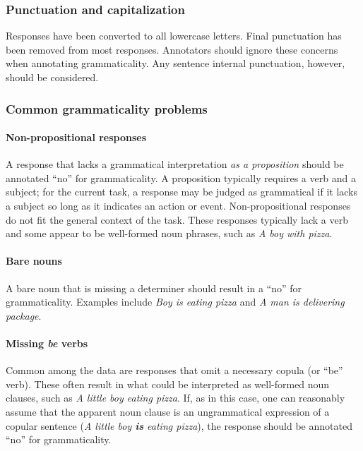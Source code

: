 \documentclass[12pt,notitlepage]{article}
\begin{document}
\subsubsection{Punctuation and capitalization} Responses have been converted to all lowercase letters. Final punctuation has been removed from most responses. Annotators should ignore these concerns when annotating grammaticality. Any sentence internal punctuation, however, should be considered.

\subsubsection{Common grammaticality problems}

\paragraph{Non-propositional responses} \label{para:non-propositional} A response that lacks a grammatical interpretation \textit{as a proposition} should be annotated ``no'' for grammaticality. A proposition typically requires a verb and a subject; for the current task, a response may be judged as grammatical if it lacks a subject so long as it indicates an action or event. Non-propositional responses do not fit the general context of the task. These responses typically lack a verb and some appear to be well-formed noun phrases, such as \textit{A boy with pizza}.

\paragraph{Bare nouns} A bare noun that is missing a determiner should result in a ``no'' for grammaticality. Examples include \textit{Boy is eating pizza} and \textit{A man is delivering package}.

\paragraph{Missing \textit{be} verbs} Common among the data are responses that omit a necessary copula (or ``be'' verb). These often result in what could be interpreted as well-formed noun clauses, such as \textit{A little boy eating pizza}. If, as in this case, one can reasonably assume that the apparent noun clause is an ungrammatical expression of a copular sentence (\textit{A little boy \textbf{is} eating pizza}), the response should be annotated ``no'' for grammaticality. 
\end{document}
